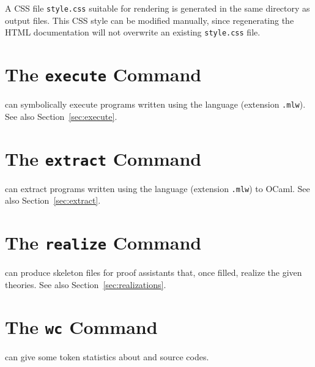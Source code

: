 A CSS file \verb|style.css| suitable for rendering is generated in the
same directory as output files. This CSS style can be modified manually,
since regenerating the HTML documentation will not overwrite an existing
\verb|style.css| file.

\section{The \texttt{execute} Command}
\label{sec:why3execute}

\why can symbolically execute programs written using the \whyml language
(extension \texttt{.mlw}). See also Section~\ref{sec:execute}.

\section{The \texttt{extract} Command}
\label{sec:why3extract}

\why can extract programs written using the \whyml language
(extension \texttt{.mlw}) to OCaml. See also Section~\ref{sec:extract}.

\section{The \texttt{realize} Command}
\label{sec:why3realize}

\why can produce skeleton files for proof assistants that, once filled,
realize the given theories. See also Section~\ref{sec:realizations}.

\section{The \texttt{wc} Command}
\label{sec:why3wc}

\why can give some token statistics about \why and \whyml source codes.

